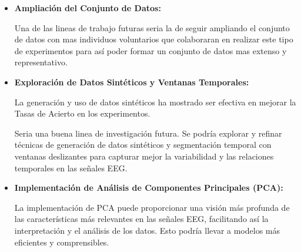\begin{itemize}
	
	\item
	\textbf{Ampliación del Conjunto de Datos:}
	
	Una de las lineas de trabajo futuras seria la de seguir ampliando el conjunto de datos con mas individuos voluntarios que colaboraran en realizar este tipo de experimentos para así poder formar un conjunto de datos mas extenso y representativo.
	
	\item
	\textbf{Exploración de Datos Sintéticos y Ventanas Temporales:}
	
	La generación y uso de datos sintéticos ha mostrado ser efectiva en mejorar la Tasas de Acierto en los experimentos.
	
	Seria una buena linea de investigación futura. Se podría explorar y refinar técnicas de generación de datos sintéticos y segmentación temporal con ventanas deslizantes para capturar mejor la variabilidad y las relaciones temporales en las señales EEG.
	
	\item
	\textbf{Implementación de Análisis de Componentes Principales (PCA):}

	La implementación de PCA puede proporcionar una visión más profunda de las características más relevantes en las señales EEG, facilitando así la interpretación y el análisis de los datos. 
	Esto podría llevar a modelos más eficientes y comprensibles.	
	
\end{itemize}	